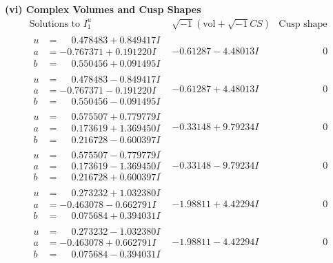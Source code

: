 \documentclass[1p]{elsarticle_modified}
\theoremstyle{definition}
\newcommand{\I}{\sqrt{-1}}
\begin{document}
\newpage\flushleft \textbf{(vi) Complex Volumes and Cusp Shapes}
$$\begin{array}{c|c|c}  
\text{Solutions to }I^u_{1}& \I (\text{vol} + \sqrt{-1}CS) & \text{Cusp shape}\\
 \hline 
\begin{aligned}
u &= \phantom{-}0.478483 + 0.849417 I \\
a &= -0.767371 + 0.191220 I \\
b &= \phantom{-}0.550456 + 0.091495 I\end{aligned}
 & -0.61287 - 4.48013 I & \phantom{-0.000000 } 0 \\ \hline\begin{aligned}
u &= \phantom{-}0.478483 - 0.849417 I \\
a &= -0.767371 - 0.191220 I \\
b &= \phantom{-}0.550456 - 0.091495 I\end{aligned}
 & -0.61287 + 4.48013 I & \phantom{-0.000000 } 0 \\ \hline\begin{aligned}
u &= \phantom{-}0.575507 + 0.779779 I \\
a &= \phantom{-}0.173619 + 1.369450 I \\
b &= \phantom{-}0.216728 - 0.600397 I\end{aligned}
 & -0.33148 + 9.79234 I & \phantom{-0.000000 } 0 \\ \hline\begin{aligned}
u &= \phantom{-}0.575507 - 0.779779 I \\
a &= \phantom{-}0.173619 - 1.369450 I \\
b &= \phantom{-}0.216728 + 0.600397 I\end{aligned}
 & -0.33148 - 9.79234 I & \phantom{-0.000000 } 0 \\ \hline\begin{aligned}
u &= \phantom{-}0.273232 + 1.032380 I \\
a &= -0.463078 - 0.662791 I \\
b &= \phantom{-}0.075684 + 0.394031 I\end{aligned}
 & -1.98811 + 4.42294 I & \phantom{-0.000000 } 0 \\ \hline\begin{aligned}
u &= \phantom{-}0.273232 - 1.032380 I \\
a &= -0.463078 + 0.662791 I \\
b &= \phantom{-}0.075684 - 0.394031 I\end{aligned}
 & -1.98811 - 4.42294 I & \phantom{-0.000000 } 0 \\ \hline\begin{aligned}

\end{aligned}
\end{array}$$
\end{document}
